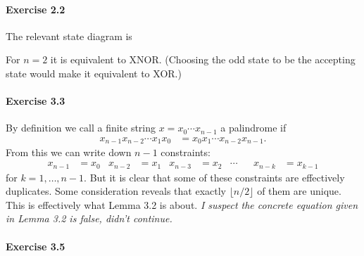 \documentclass{article}
\begin{document}
\paragraph{Exercise 2.2} The relevant state diagram is
\begin{center}
\end{center}
For $n = 2$ it is equivalent to XNOR. (Choosing the odd state to be the accepting state would make it equivalent to XOR.)

\paragraph{Exercise 3.3} By definition we call a finite string $x = x_0 \cdots x_{n - 1}$ a palindrome if
\begin{align*}
    x_{n - 1}x_{n - 2} \cdots x_1x_0 &= x_0x_1 \cdots x_{n - 2}x_{n - 1}.
\end{align*}
From this we can write down $n - 1$ constraints:
\begin{align*}
    x_{n - 1} &= x_0  &  x_{n - 2} &= x_1  &  x_{n - 3} &= x_2  &\cdots&&  x_{n - k} &= x_{k - 1}
\end{align*}
for $k = 1, \ldots, n - 1$. But it is clear that some of these constraints are effectively duplicates. Some consideration reveals that exactly $\lfloor n/2 \rfloor$ of them are unique. This is effectively what Lemma 3.2 is about. \emph{I suspect the concrete equation given in Lemma 3.2 is false, didn't continue.}


\paragraph{Exercise 3.5}
\end{document}
